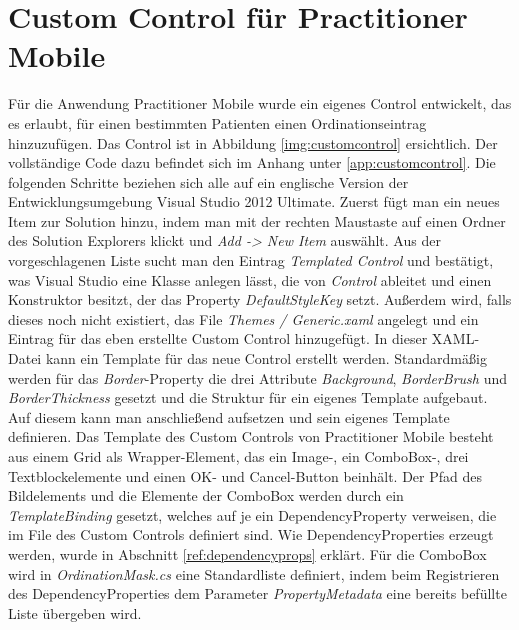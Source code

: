 \documentclass[a4paper,bibtotoc,oneside]{scrbook}
\begin{document}
\section[Custom Control für Practitioner Mobile]{Custom Control für Practitioner Mobile}
Für die Anwendung Practitioner Mobile wurde ein eigenes Control entwickelt, das es erlaubt, für einen bestimmten Patienten einen Ordinationseintrag hinzuzufügen. Das Control ist in Abbildung \ref{img:customcontrol} ersichtlich. Der vollständige Code dazu befindet sich im Anhang unter \ref{app:customcontrol}.
\newline
\newline
 Die folgenden Schritte beziehen sich alle auf ein englische Version der Entwicklungsumgebung Visual Studio 2012 Ultimate.
\newline
\newline
Zuerst fügt man ein neues Item zur Solution hinzu, indem man mit der rechten Maustaste auf einen Ordner des Solution Explorers klickt und \textit{Add -> New Item} auswählt. Aus der vorgeschlagenen Liste sucht man den Eintrag \textit{Templated Control} und bestätigt, was Visual Studio eine Klasse anlegen lässt, die von \textit{Control} ableitet und einen Konstruktor besitzt, der das Property \textit{DefaultStyleKey} setzt.
\newline
Außerdem wird, falls dieses noch nicht existiert, das File \textit{Themes / Generic.xaml} angelegt und ein Eintrag für das eben erstellte Custom Control hinzugefügt. In dieser XAML-Datei kann ein Template für das neue Control erstellt werden. Standardmäßig werden für das \textit{Border}-Property die drei Attribute \textit{Background}, \textit{BorderBrush} und \textit{BorderThickness} gesetzt und die Struktur für ein eigenes Template aufgebaut. Auf diesem kann man anschließend aufsetzen und sein eigenes Template definieren.
\newline
\newline
Das Template des Custom Controls von Practitioner Mobile besteht aus einem Grid als Wrapper-Element, das ein Image-, ein ComboBox-, drei Textblockelemente und einen OK- und Cancel-Button beinhält. Der Pfad des Bildelements und die Elemente der ComboBox werden durch ein \textit{TemplateBinding} gesetzt, welches auf je ein DependencyProperty verweisen, die im File des Custom Controls definiert sind. Wie DependencyProperties erzeugt werden, wurde in Abschnitt \ref{ref:dependencyprops} erklärt.
\newline
\newline
Für die ComboBox wird in \textit{OrdinationMask.cs} eine Standardliste definiert, indem beim Registrieren des DependencyProperties dem Parameter \textit{PropertyMetadata} eine bereits befüllte Liste übergeben wird.
\end{document}
